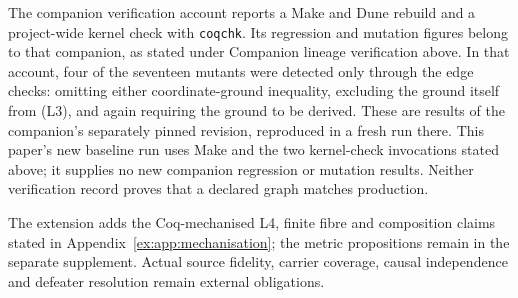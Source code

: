 \documentclass[11pt]{article}
\theoremstyle{definition}
\newcommand{\code}[1]{\texttt{#1}}
\begin{document}
The companion verification account reports a Make and Dune rebuild and a project-wide kernel check with \code{coqchk}. Its regression and mutation figures belong to that companion, as stated under Companion lineage verification above. In that account, four of the seventeen mutants were detected only through the edge checks: omitting either coordinate-ground inequality, excluding the ground itself from (L3), and again requiring the ground to be derived. These are results of the companion's separately pinned revision, reproduced in a fresh run there. This paper's new baseline run uses Make and the two kernel-check invocations stated above; it supplies no new companion regression or mutation results. Neither verification record proves that a declared graph matches production.

The extension adds the Coq-mechanised L4, finite fibre and composition claims stated in Appendix~\ref{ex:app:mechanisation}; the metric propositions remain in the separate supplement. Actual source fidelity, carrier coverage, causal independence and defeater resolution remain external obligations.
\end{document}
